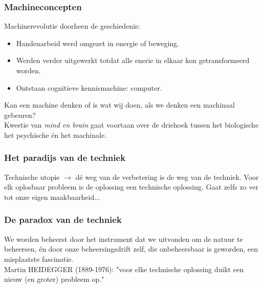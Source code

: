 \documentclass[11pt,a4paper]{article}
\begin{document}
\subsubsection*{Machineconcepten}
Machinerevolutie doorheen de geschiedenis:
\begin{itemize}
\item Handenarbeid werd omgezet in energie of beweging.
\item Werden verder uitgewerkt totdat alle enerie in elkaar kon getransformeerd worden.
\item Ontstaan cognitieve kennismachine: computer.
\end{itemize}
Kan een machine denken of is wat wij doen, als we denken een machinaal gebeuren?\\ 
Kwestie van \textit{mind en brain} gaat voortaan over de driehoek tussen het biologische het psychische \'en het machinale.
\subsubsection*{Het paradijs van de techniek}
Technische utopie $\rightarrow$ d\'e weg van de verbetering is de weg van de techniek. Voor elk oplosbaar probleem is de oplossing een technische oplossing. Gaat zelfs zo ver tot onze eigen maakbaarheid...
\subsubsection*{De paradox van de techniek}
We worden beheerst door het instrument dat we uitvonden om de natuur te beheersen, \'en door onze beheersingsdrift zelf, die onbeheersbaar is geworden, een misplaatste fascinatie.
\\
Martin HEIDEGGER (1889-1976): "voor elke technische oplossing duikt een nieuw (en groter) probleem op."
\end{document}
